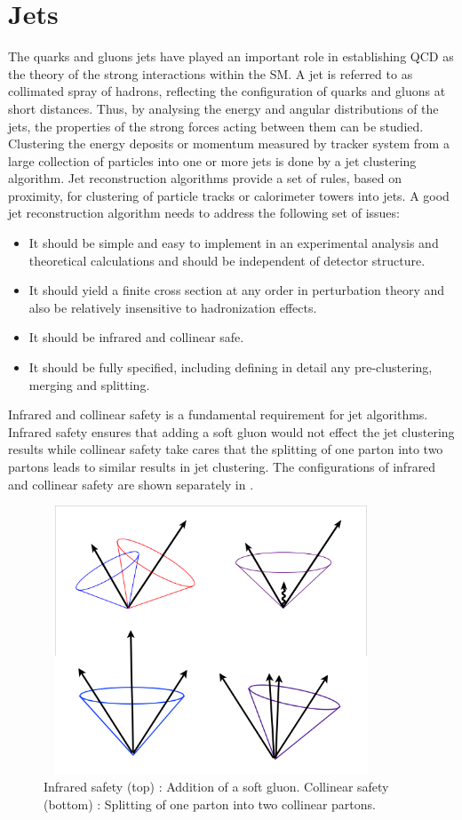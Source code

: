 \section{Jets}\label{Se:Jet}
The quarks and gluons jets have played an important role in establishing QCD as the theory of the strong interactions within the SM. A jet is 
referred to as collimated spray of hadrons, reflecting the configuration of quarks and gluons at short distances. Thus, by analysing the energy
and angular distributions of the jets, the properties of the strong forces acting between them can be studied. Clustering the energy deposits 
or momentum measured by tracker system from a large collection of particles into one or more jets is done by a jet clustering algorithm. 
Jet reconstruction algorithms provide a set of rules, based on proximity, for clustering of particle tracks or calorimeter towers into jets. A good 
jet reconstruction algorithm needs to address the following set of issues:
\begin{itemize}
\item It should be simple and easy to implement in an experimental analysis and theoretical calculations and should be independent of detector structure.
\item It should yield a finite cross section at any order in perturbation theory and also be relatively insensitive to hadronization effects.
\item It should be infrared and collinear safe.
\item It should be fully specified, including defining in detail any pre-clustering, merging and splitting.
\end{itemize}
Infrared and collinear safety is a fundamental requirement for jet algorithms. Infrared safety ensures that adding a soft gluon would not
effect the jet clustering results while collinear safety take cares that the splitting of one parton into two partons leads to similar
results in jet clustering. The configurations of infrared and collinear safety are shown separately in \fig{\ref{fig:JetCones}}.
\begin{figure}[h]
\centering
\includegraphics[width=10cm,height=8cm]{ch4/figures/JetCones.png}
\caption{Infrared safety (top) : Addition of a soft gluon. Collinear safety (bottom) : Splitting of one parton into two collinear partons.}
\label{fig:JetCones}
\end{figure}

